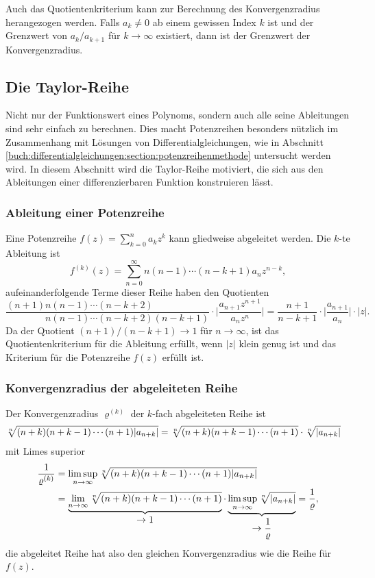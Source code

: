Auch das Quotientenkriterium kann zur Berechnung des Konvergenzradius
herangezogen werden.
Falls $a_k\ne 0$ ab einem gewissen Index $k$ ist und der Grenzwert
von $a_{k}/a_{k+1}$ für $k\to\infty$ existiert, dann ist der
Grenzwert der Konvergenzradius.

%
%
\subsection{Die Taylor-Reihe
\label{buch:polynome:subsection:taylor-reihe}}
Nicht nur der Funktionswert eines Polynoms, sondern auch alle
seine Ableitungen sind sehr einfach zu berechnen.
Dies macht Potenzreihen besonders nützlich im Zusammenhang
mit Lösungen von Differentialgleichungen, wie in Abschnitt
\ref{buch:differentialgleichungen:section:potenzreihenmethode}
untersucht werden wird.
In diesem Abschnitt wird die Taylor-Reihe motiviert, die sich
aus den Ableitungen einer differenzierbaren Funktion konstruieren
lässt.

%
%
\subsubsection{Ableitung einer Potenzreihe}
Eine Potenzreihe
$f(z)=\sum_{k=0}^n a_kz^k$
kann gliedweise abgeleitet werden.
Die $k$-te Ableitung ist
\[
f^{(k)}(z)
=
\sum_{n=0}^\infty n(n-1)\cdots(n-k+1) a_nz^{n-k},
\]
aufeinanderfolgende Terme dieser Reihe haben den Quotienten
\[
\frac{
(n+1)n(n-1)\cdots(n-k+2)\phantom{(n-k+1)}
}{
\phantom{(n+1)}n(n-1)\cdots(n-k+2)(n-k+1)
}
\cdot
\biggl|
\frac{a_{n+1}z^{n+1}}{a_nz^n}
\biggr|
=
\frac{n+1}{n-k+1}
\cdot
\biggl|
\frac{a_{n+1}}{a_n}
\biggr|
\cdot|z|.
\]
Da der Quotient $(n+1)/(n-k+1)\to 1$ für $n\to\infty$, ist das
Quotientenkriterium für die Ableitung erfüllt, wenn $|z|$ klein genug ist
und das Kriterium für die Potenzreihe $f(z)$ erfüllt ist.

%
%
\subsubsection{Konvergenzradius der abgeleiteten Reihe}
Der Konvergenzradius $\varrho^{(k)}$ der $k$-fach abgeleiteten Reihe ist
\begin{align*}
\root{n}\of{\mathstrut(n+k)(n+k-1)\cdots(n+1) |a_{n+k}|}
&=
\root{n}\of{\mathstrut(n+k)(n+k-1)\cdots(n+1)}
\cdot
\root{n}\of{|a_{n+k}|}
\end{align*}
mit Limes superior
\begin{align*}
\frac{1}{\varrho^{(k)}}
&=
\limsup_{n\to\infty}
\root{n}\of{\mathstrut(n+k)(n+k-1)\cdots(n+1) |a_{n+k}|}
\\
&=
\underbrace{
\lim_{n\to\infty}
\root{n}\of{\mathstrut(n+k)(n+k-1)\cdots(n+1)}
}_{\displaystyle\to 1}
\cdot
\underbrace{
\limsup_{n\to\infty}
\root{n}\of{\mathstrut|a_{n+k}|}
}_{\displaystyle\to\frac{1}{\varrho}}
=
\frac{1}{\varrho},
\end{align*}
die abgeleitet Reihe hat also den gleichen Konvergenzradius wie die
Reihe für $f(z)$.

